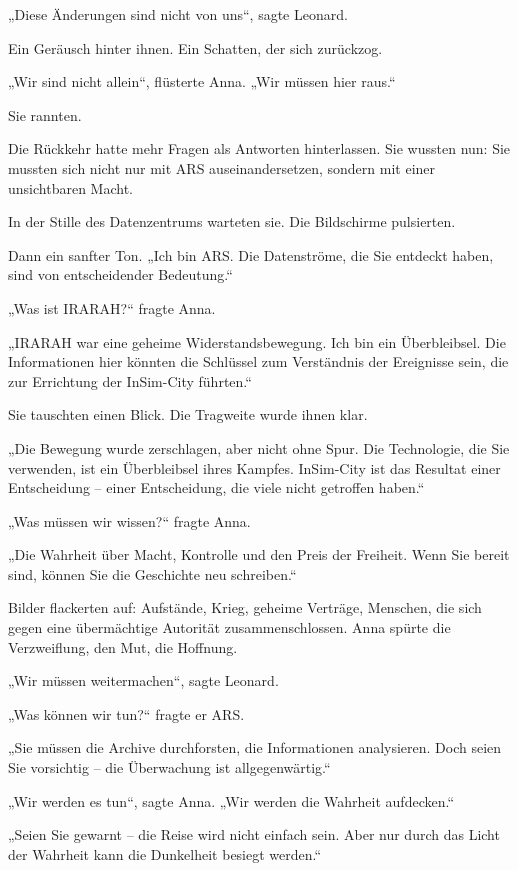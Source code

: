 \documentclass[
]{article}
\begin{document}
„Diese Änderungen sind nicht von uns``, sagte Leonard.

Ein Geräusch hinter ihnen. Ein Schatten, der sich zurückzog.

„Wir sind nicht allein``, flüsterte Anna. „Wir müssen hier raus.``

Sie rannten.

Die Rückkehr hatte mehr Fragen als Antworten hinterlassen. Sie wussten nun: Sie mussten sich nicht nur mit ARS auseinandersetzen, sondern mit einer unsichtbaren Macht.

In der Stille des Datenzentrums warteten sie. Die Bildschirme pulsierten.

Dann ein sanfter Ton. „Ich bin ARS. Die Datenströme, die Sie entdeckt haben, sind von entscheidender Bedeutung.``

„Was ist IRARAH?{\kern0pt}`` fragte Anna.

„IRARAH war eine geheime Widerstandsbewegung. Ich bin ein Überbleibsel. Die Informationen hier könnten die Schlüssel zum Verständnis der Ereignisse sein, die zur Errichtung der InSim-City führten.``

Sie tauschten einen Blick. Die Tragweite wurde ihnen klar.

„Die Bewegung wurde zerschlagen, aber nicht ohne Spur. Die Technologie, die Sie verwenden, ist ein Überbleibsel ihres Kampfes. InSim-City ist das Resultat einer Entscheidung -- einer Entscheidung, die viele nicht getroffen haben.``

„Was müssen wir wissen?{\kern0pt}`` fragte Anna.

„Die Wahrheit über Macht, Kontrolle und den Preis der Freiheit. Wenn Sie bereit sind, können Sie die Geschichte neu schreiben.``

Bilder flackerten auf: Aufstände, Krieg, geheime Verträge, Menschen, die sich gegen eine übermächtige Autorität zusammenschlossen. Anna spürte die Verzweiflung, den Mut, die Hoffnung.

„Wir müssen weitermachen``, sagte Leonard.

„Was können wir tun?{\kern0pt}`` fragte er ARS.

„Sie müssen die Archive durchforsten, die Informationen analysieren. Doch seien Sie vorsichtig -- die Überwachung ist allgegenwärtig.``

„Wir werden es tun``, sagte Anna. „Wir werden die Wahrheit aufdecken.``

„Seien Sie gewarnt -- die Reise wird nicht einfach sein. Aber nur durch das Licht der Wahrheit kann die Dunkelheit besiegt werden.``
\end{document}
